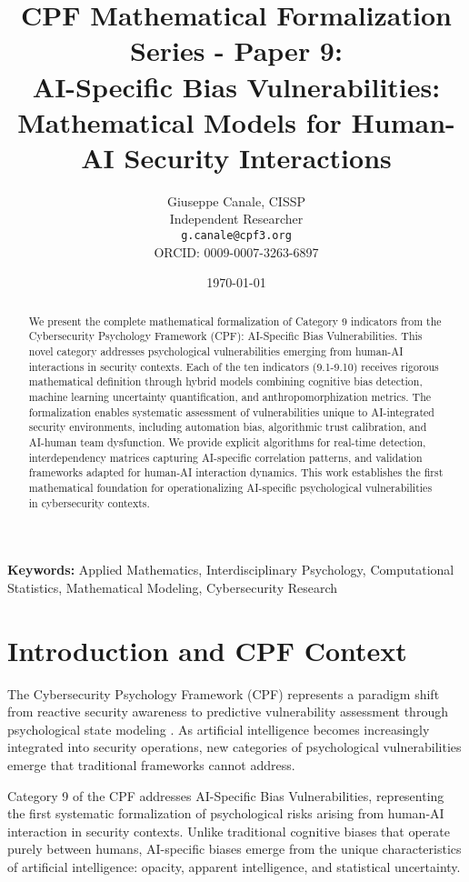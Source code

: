 \documentclass[11pt,a4paper]{article}
\title{CPF Mathematical Formalization Series - Paper 9:\\AI-Specific Bias Vulnerabilities: Mathematical Models for Human-AI Security Interactions}
\author{
    Giuseppe Canale, CISSP\\
    Independent Researcher\\
    \texttt{g.canale@cpf3.org}\\
    ORCID: 0009-0007-3263-6897
}
\date{\today}
\begin{document}
\maketitle

\begin{abstract}
We present the complete mathematical formalization of Category 9 indicators from the Cybersecurity Psychology Framework (CPF): AI-Specific Bias Vulnerabilities. This novel category addresses psychological vulnerabilities emerging from human-AI interactions in security contexts. Each of the ten indicators (9.1-9.10) receives rigorous mathematical definition through hybrid models combining cognitive bias detection, machine learning uncertainty quantification, and anthropomorphization metrics. The formalization enables systematic assessment of vulnerabilities unique to AI-integrated security environments, including automation bias, algorithmic trust calibration, and AI-human team dysfunction. We provide explicit algorithms for real-time detection, interdependency matrices capturing AI-specific correlation patterns, and validation frameworks adapted for human-AI interaction dynamics. This work establishes the first mathematical foundation for operationalizing AI-specific psychological vulnerabilities in cybersecurity contexts.
\end{abstract}

\textbf{Keywords:} Applied Mathematics, Interdisciplinary Psychology, Computational Statistics, Mathematical Modeling, Cybersecurity Research

\section{Introduction and CPF Context}

The Cybersecurity Psychology Framework (CPF) represents a paradigm shift from reactive security awareness to predictive vulnerability assessment through psychological state modeling \cite{canale2024cpf}. As artificial intelligence becomes increasingly integrated into security operations, new categories of psychological vulnerabilities emerge that traditional frameworks cannot address.

Category 9 of the CPF addresses AI-Specific Bias Vulnerabilities, representing the first systematic formalization of psychological risks arising from human-AI interaction in security contexts. Unlike traditional cognitive biases that operate purely between humans, AI-specific biases emerge from the unique characteristics of artificial intelligence: opacity, apparent intelligence, and statistical uncertainty.
\end{document}
